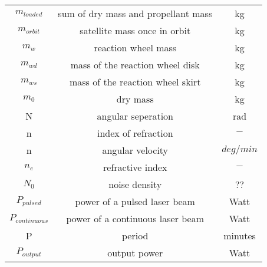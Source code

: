 \begin{center}
\begin{longtable}{c|c|c}
$m_{loaded}$												& sum of dry mass and propellant mass																			& kg \\

$m_{orbit}$                         & satellite mass once in orbit                														& kg \\

$m_w$                               & reaction wheel mass  																										& kg \\

$m_{wd}$                            & mass of the reaction wheel disk  																				& kg \\

$m_{ws}$                            & mass of the reaction wheel skirt 																				& kg \\

$m_0$                               & dry mass                         																				& kg \\

N 																	& angular seperation 																											& rad \\

n 																	& index of refraction																											& $-$ \\

n                                		& angular velocity                             														& $deg/{min}$ \\

$n_e$ 															& refractive index 																												& $-$ \\

$N_0$                           		& noise density                                														& ?? \\

$P_{pulsed}$ 												& power of a pulsed laser beam																						& Watt \\

$P_{continuous}$ 										& power of a continuous laser beam																				& Watt \\

P                             			& period                                      														& minutes \\

$P_{output}$                       	& output power                             																& Watt \\


\end{longtable}
\end{center}
